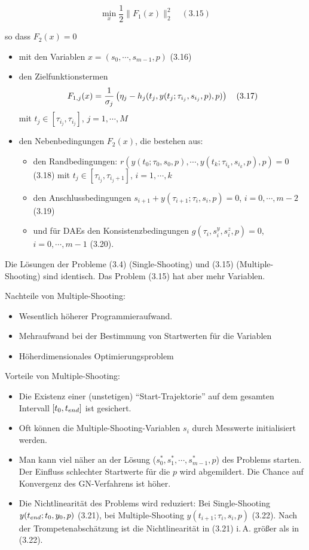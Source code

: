 \[ \min_x \frac  12 \|F_1(x)\|_2^2 \quad (3.15) \]

so dass $F_2(x) = 0$

\begin{itemize}
\item mit den Variablen $x = (s_0,\cdots,s_{m-1}, p)$ (3.16)
\item den Zielfunktionstermen
\[ F_{1,j} (x) = \frac 1{\sigma_j} \left( \eta_j - h_j(t_j,y(t_j; \tau_{i_j}, s_{i_j}, p), p) \right)  \quad (3.17) \]
mit $t_j \in [\tau_{i_j}, \tau_{i_j}]$, $j=1,\cdots,M$
\item den Nebenbedingungen $F_2(x)$, die bestehen aus:
\begin{itemize}
\item den Randbedingungen: $r(y(t_0;\tau_0,s_0,p),\cdots,y(t_k;\tau_{i_k},s_{i_k},p), p) = 0 $ (3.18) mit $t_j \in [\tau_{i_j},\tau_{i_j + 1}]$, $i=1,\cdots,k$
\item den Anschlussbedingungen $s_{i+1}+y(\tau_{i+1};\tau_i,s_i,p)=0$, $i=0,\cdots,m-2$ (3.19)
\item und für DAEs den Konsistenzbedingungen  $g(\tau_i, s_i^y, s_i^z,p)=0$, $i=0,\cdots,m-1$ (3.20).
\end{itemize}
\end{itemize}

Die Lösungen der Probleme (3.4) (Single-Shooting) und (3.15) (Multiple-Shooting) sind identisch. Das Problem (3.15) hat aber mehr Variablen.

Nachteile von Multiple-Shooting:

\begin{itemize}
\item Wesentlich höherer Programmieraufwand.
\item Mehraufwand bei der Bestimmung von Startwerten für die Variablen
\item Höherdimensionales Optimierungsproblem
\end{itemize}

Vorteile von Multiple-Shooting:

\begin{itemize}
\item Die Existenz einer (unstetigen) "`Start-Trajektorie"' auf dem gesamten Intervall $[t_0,t_{end}]$ ist gesichert.
\item Oft können die Multiple-Shooting-Variablen $s_i$ durch Messwerte initialisiert werden.
\item Man kann viel näher an der Lösung ($s_0^*,s_1^*,\cdots,s_{m-1}^*, p$) des Problems starten. Der Einfluss schlechter Startwerte für die $p$ wird abgemildert. Die Chance auf Konvergenz des GN-Verfahrens ist höher.
\item Die Nichtlinearität des Problems wird reduziert: Bei Single-Shooting $y(t_{end}; t_0,y_0,p)$ (3.21), bei Multiple-Shooting $y(t_{i+1};\tau_i,s_i,p)$ (3.22). Nach der Trompetenabschätzung ist die Nichtlinearität in (3.21) i.\,A. größer als in (3.22).
\end{itemize}

